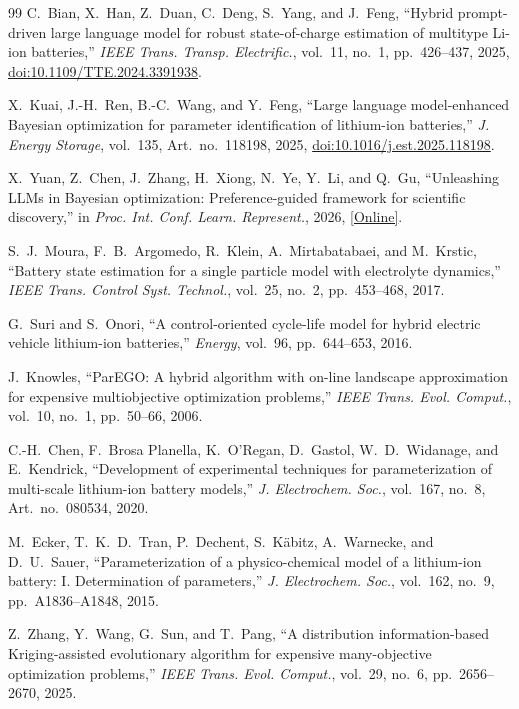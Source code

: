\begin{thebibliography}{99}
C.~Bian, X.~Han, Z.~Duan, C.~Deng, S.~Yang, and J.~Feng, ``Hybrid prompt-driven
large language model for robust state-of-charge estimation of multitype
Li-ion batteries,'' \textit{IEEE Trans. Transp. Electrific.}, vol.~11, no.~1,
pp.~426--437, 2025,
\href{https://doi.org/10.1109/TTE.2024.3391938}
{doi:10.1109/TTE.2024.3391938}.

X.~Kuai, J.-H.~Ren, B.-C.~Wang, and Y.~Feng,
``Large language model-enhanced Bayesian optimization for parameter
identification of lithium-ion batteries,'' \textit{J. Energy Storage},
vol.~135, Art.~no.~118198, 2025,
\href{https://doi.org/10.1016/j.est.2025.118198}
{doi:10.1016/j.est.2025.118198}.

X.~Yuan, Z.~Chen, J.~Zhang, H.~Xiong, N.~Ye, Y.~Li, and Q.~Gu,
``Unleashing LLMs in Bayesian optimization: Preference-guided framework
for scientific discovery,''
in \textit{Proc. Int. Conf. Learn. Represent.}, 2026,
\href{https://proceedings.iclr.cc/paper_files/paper/2026/hash/85381f4549b5ddf1d48e2e287d7d3d15-Abstract-Conference.html}{[Online]}.

S.~J.~Moura, F.~B.~Argomedo, R.~Klein, A.~Mirtabatabaei, and M.~Krstic,
``Battery state estimation for a single particle model with electrolyte
dynamics,''
\textit{IEEE Trans. Control Syst. Technol.},
vol.~25, no.~2, pp.~453--468, 2017.

G.~Suri and S.~Onori, ``A control-oriented cycle-life model for hybrid electric vehicle lithium-ion batteries,'' \textit{Energy}, vol.~96, pp.~644--653, 2016.

J.~Knowles, ``ParEGO: A hybrid algorithm with on-line landscape approximation
for expensive multiobjective optimization problems,'' \textit{IEEE Trans.
Evol. Comput.}, vol.~10, no.~1, pp.~50--66, 2006.

C.-H.~Chen, F.~Brosa Planella, K.~O'Regan, D.~Gastol, W.~D.~Widanage, and
E.~Kendrick, ``Development of experimental techniques for parameterization of
multi-scale lithium-ion battery models,'' \textit{J. Electrochem. Soc.},
vol.~167, no.~8, Art.~no.~080534, 2020.

M.~Ecker, T.~K.~D.~Tran, P.~Dechent, S.~K\"abitz, A.~Warnecke, and
D.~U.~Sauer, ``Parameterization of a physico-chemical model of a lithium-ion
battery: I. Determination of parameters,'' \textit{J. Electrochem. Soc.},
vol.~162, no.~9, pp.~A1836--A1848, 2015.

Z.~Zhang, Y.~Wang, G.~Sun, and T.~Pang, ``A distribution information-based
Kriging-assisted evolutionary algorithm for expensive many-objective
optimization problems,'' \textit{IEEE Trans. Evol. Comput.}, vol.~29, no.~6,
pp.~2656--2670, 2025.


\end{thebibliography}
